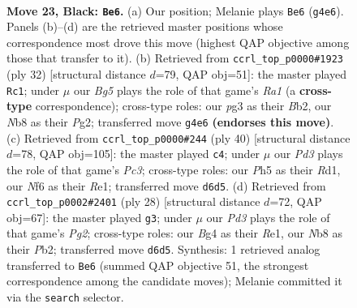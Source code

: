 \documentclass[11pt]{article}
\begin{document}
\clearpage

\begin{figure}[p]\centering
\begin{subfigure}{0.46\textwidth}\centering
\resizebox{\linewidth}{!}{%
\newchessgame
\chessboard[
  setfen={1n2r1k1/r3qpp1/1p1p1n2/4p2p/P1B1P1bN/2N3P1/2PQ1P1P/R1R3K1 b - - 8 23},
  showmover=false,
  pgfstyle=straightmove, color=movearrow, markmove={g4-e6}
]}
\caption{}
\end{subfigure}\hfill
\begin{subfigure}{0.46\textwidth}\centering
\resizebox{\linewidth}{!}{%
\newchessgame
\chessboard[
  setfen={5rk1/1bqnrppp/1p1bp3/p7/P1PP4/3B1N1P/1B3PP1/R2QR1K1 w - - 0 17},
  showmover=false,
  pgfstyle=straightmove, color=movearrow, markmove={a1-c1}
]}
\caption{}
\end{subfigure}
\\[4pt]
\begin{subfigure}{0.46\textwidth}\centering
\resizebox{\linewidth}{!}{%
\newchessgame
\chessboard[
  setfen={r3r1k1/1p1q1pp1/2p2nnp/p1b1p3/P7/1PPP1NNP/1BQ2PP1/3RR1K1 w - - 5 21},
  showmover=false,
  pgfstyle=straightmove, color=movearrow, markmove={c3-c4}
]}
\caption{}
\end{subfigure}\hfill
\begin{subfigure}{0.46\textwidth}\centering
\resizebox{\linewidth}{!}{%
\newchessgame
\chessboard[
  setfen={r4rk1/2p2pp1/p1n2q1p/1pb1p3/4P3/1PP2N2/1P3PPP/R2QRNK1 w - - 0 15},
  showmover=false,
  pgfstyle=straightmove, color=movearrow, markmove={g2-g3}
]}
\caption{}
\end{subfigure}
\caption{\textbf{Move 23, Black: \texttt{Be6}.} (a) Our position; Melanie plays \texttt{Be6} (\texttt{g4e6}). Panels (b)--(d) are the retrieved master positions whose correspondence most drove this move (highest QAP objective among those that transfer to it). (b) Retrieved from \texttt{ccrl\_top\_p0000\#1923} (ply 32) [structural distance $d$=79, QAP obj=51]: the master played \texttt{Rc1}; under $\mu$ our \emph{Bg5} plays the role of that game's \emph{Ra1} (a \textbf{cross-type} correspondence); cross-type roles: our \emph{p}g3 as their \emph{B}b2, our \emph{N}b8 as their \emph{P}g2; transferred move \texttt{g4e6} \textbf{(endorses this move)}. (c) Retrieved from \texttt{ccrl\_top\_p0000\#244} (ply 40) [structural distance $d$=78, QAP obj=105]: the master played \texttt{c4}; under $\mu$ our \emph{Pd3} plays the role of that game's \emph{Pc3}; cross-type roles: our \emph{P}h5 as their \emph{R}d1, our \emph{N}f6 as their \emph{R}e1; transferred move \texttt{d6d5}. (d) Retrieved from \texttt{ccrl\_top\_p0002\#2401} (ply 28) [structural distance $d$=72, QAP obj=67]: the master played \texttt{g3}; under $\mu$ our \emph{Pd3} plays the role of that game's \emph{Pg2}; cross-type roles: our \emph{B}g4 as their \emph{R}e1, our \emph{N}b8 as their \emph{P}b2; transferred move \texttt{d6d5}. Synthesis: 1 retrieved analog transferred to \texttt{Be6} (summed QAP objective 51, the strongest correspondence among the candidate moves); Melanie committed it via the \texttt{search} selector.}
\label{fig:thought-m45}
\end{figure}
\end{document}
